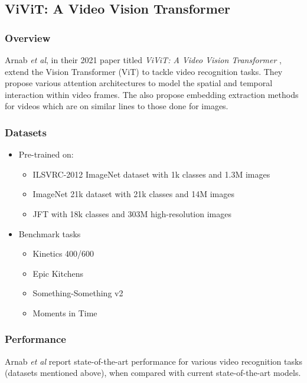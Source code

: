 \subsection{ViViT: A Video Vision Transformer} \label{appendix:vivit-paper}

\subsubsection{Overview}

\par Arnab \textit{et al}, in their 2021 paper titled \textit{ViViT: A Video Vision Transformer} \cite{vivit}, extend the Vision Transformer (ViT) \cite{vit} to tackle video recognition tasks. 
They propose various attention architectures to model the spatial and temporal interaction within video frames. 
The also propose embedding extraction methods for videos which are on similar lines to those done for images. \par

\subsubsection{Datasets}
\begin{itemize}
\item Pre-trained on:
	\begin{itemize}
		\item ILSVRC-2012 ImageNet dataset with 1k classes and 1.3M images
		\item ImageNet 21k dataset with 21k classes and 14M images 
		\item JFT with 18k classes and 303M high-resolution images
	\end{itemize}
\item Benchmark tasks
	\begin{itemize}
		\item Kinetics 400/600
		\item Epic Kitchens
		\item Something-Something v2
		\item Moments in Time
	\end{itemize}
\end{itemize}


\subsubsection{Performance}
\par Arnab \textit{et al} report state-of-the-art performance for various video recognition tasks (datasets mentioned above), when compared with current state-of-the-art models.\par


